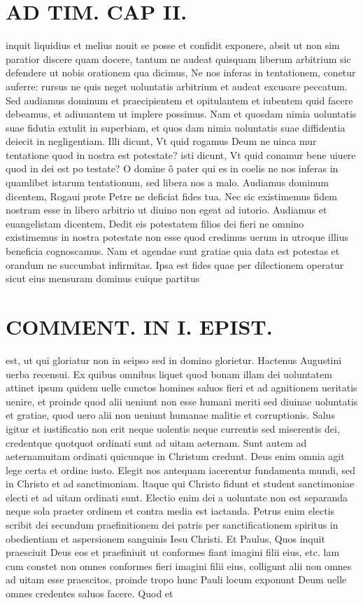 \documentclass{article}
\begin{document}
\begin{pages}
\section*{AD TIM. CAP II. }
\marginpar{[ p.114 ]}\pstart inquit liquidius et melius nouit se posse et confidit exponere, absit ut non sim paratior discere quam docere, tantum ne audeat quisquam liberum arbitrium sic defendere ut nobis orationem qua dicimus, Ne nos inferas in tentationem, conetur auferre: rursus ne quis neget uoluntatis arbitrium et audeat excusare peccatum. Sed audiamus dominum et praecipientem et opitulantem et iubentem quid facere debeamus, et adiuuantem ut implere possimus. Nam et quosdam nimia uoluntatis suae fidutia extulit in superbiam, et quos dam nimia uoluntatis suae diffidentia deiecit in negligentiam. Illi dicunt, Vt quid rogamus Deum ne uinca mur tentatione quod in nostra est potestate? isti dicunt, Vt quid conamur bene uiuere quod in dei est po testate? O domine ô pater qui es in coelis ne nos inferas in quamlibet istarum tentationum, sed libera nos a malo. Audiamus dominum dicentem, Rogaui prote Petre ne deficiat fides tua. Nec sic existimemus fidem nostram esse in libero arbitrio ut diuino non egeat ad iutorio. Audiamus et euangelistam dicentem, Dedit eis potestatem filios dei fieri ne omnino existimemus in nostra potestate non esse quod credimus uerum in utroque illius beneficia cognoscamus. Nam et agendae sunt gratiae quia data est potestas et orandum ne succumbat infirmitas. Ipsa est fides quae per dilectionem operatur sicut eius mensuram dominus cuique partitus  \pend
\section*{COMMENT. IN I. EPIST. }\pstart est, ut qui gloriatur non in seipso sed in domino glorietur. Hactenus Augustini uerba recensui. Ex quibus omnibus liquet quod bonam illam dei uoluntatem attinet ipsum quidem uelle cunctos homines saluos fieri et ad agnitionem ueritatis uenire, et proinde quod alii ueniunt non esse humani meriti sed diuinae uoluntatis et gratiae, quod uero alii non ueniunt humanae malitie et corruptionis. Salus igitur et iustificatio non erit neque uolentis neque currentis sed miserentis dei, credentque quotquot ordinati sunt ad uitam aeternam. Sunt autem ad aeternamuitam ordinati quicunque in Christum credunt. Deus enim omnia agit lege certa et ordine iusto. Elegit nos antequam iacerentur fundamenta mundi, sed in Christo et ad sanctimoniam. ltaque qui Christo fidunt et student sanctimoniae electi et ad uitam ordinati sunt. Electio enim dei a uoluntate non est separanda neque sola praeter ordinem et contra media est iactanda. Petrus enim electis scribit dei secundum praefinitionem dei patris per sanctificationem spiritus in obedientiam et aspersionem sanguinis Iesu Christi. Et Paulus, Quos inquit praesciuit Deus eos et praefiniuit ut conformes fiant imagini filii eius, etc. lam cum constet non omnes conformes fieri imagini filii eius, colligunt alii non omnes ad uitam esse praescitos, proinde tropo hunc Pauli locum exponunt Deum uelle omnes credentes saluos facere. Quod et  \pend

\end{pages}
\end{document}
